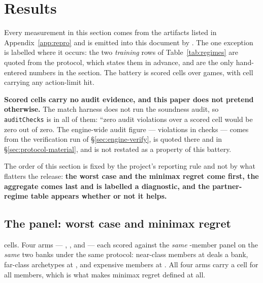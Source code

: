 \section{Results}
\label{sec:results}

Every measurement in this section comes from the artifacts listed in Appendix~\ref{app:repro} and is
emitted into this document by . The one exception is
labelled where it occurs: the two \emph{training} rows of Table~\ref{tab:regimes} are quoted from the
protocol, which states them in advance, and are the only hand-entered numbers in the section. The battery is \vsevenScoredCells{} scored cells over \vsevenScoredGames{} games, with
\vsevenLimitCells{} cell carrying any action-limit hit.

\textbf{Scored cells carry no audit evidence, and this paper does not pretend otherwise.} The match
harness does not run the soundness audit, so \texttt{auditChecks} is \vsevenAuditChecks{} in all
\vsevenScoredCells{} of them: ``zero audit violations over a scored cell would be zero out of zero.
The engine-wide audit figure --- \vsevenVerifyViolations{} violations in \vsevenVerifyChecks{} checks
--- comes from the verification run of \S\ref{sec:engine-verify}, is quoted there and in
\S\ref{sec:protocol-material}, and is not restated as a property of this battery.

The order of this section is fixed by the project's reporting rule and not by what flatters the
release: \textbf{the worst case and the minimax regret come first, the aggregate comes last and is
labelled a diagnostic, and the partner-regime table appears whether or not it helps.}

\subsection{The panel: worst case and minimax regret}
\label{sec:results-panel}

\vsevenPanelCells{} cells. Four arms --- \frozen{}, \incumbent{}, \fcheap{} and \composite{} --- each
scored against the \emph{same} \vsevenPanelMembers{}-member panel on the \emph{same} two banks under
the same protocol: \vsevenPanelNear{} near-class members at \vsevenDealsNear{} deals a bank,
\vsevenPanelFar{} far-class archetypes at \vsevenDealsFar{}, and \vsevenPanelExpensive{} expensive
members at \vsevenDealsExpensive{}. All four arms carry a cell for all \vsevenPanelMembers{} members, which is what makes minimax
regret defined at all.

